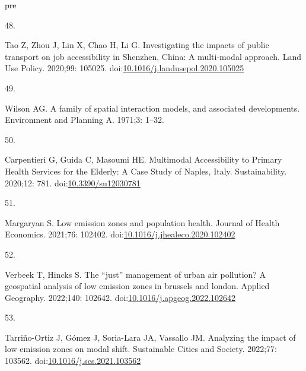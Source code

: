 \documentclass[10pt,letterpaper]{article}
\newlength{\cslhangindent}
\newlength{\csllabelwidth}
\newlength{\cslentryspacingunit} %
\newenvironment{CSLReferences}[2] %
 {%
  \setlength{\parindent}{0pt}
  \ifodd #1
  \let\oldpar\par
  \def\par{\hangindent=\cslhangindent\oldpar}
  \fi
  \setlength{\parskip}{#2\cslentryspacingunit}
 }%
 {}
\newcommand{\CSLLeftMargin}[1]{\parbox[t]{\csllabelwidth}{#1}}
\newcommand{\CSLRightInline}[1]{\parbox[t]{\linewidth - \csllabelwidth}{#1}\break}
\providecommand{\DIFdeltex}[1]{{\protect\color{red}\sout{#1}}}                      %
\providecommand{\DIFaddbegin}{} %
\providecommand{\DIFaddend}{} %
\providecommand{\DIFdelbegin}{} %
\providecommand{\DIFdelend}{} %
\providecommand{\DIFdel}[1]{\texorpdfstring{\DIFdeltex{#1}}{}} %
\newcommand{\DIFscaledelfig}{0.5}
\newlength{\DIFdelgraphicswidth} %
\newlength{\DIFdelgraphicsheight} %
\newcommand{\DIFaddincludegraphics}[2][]{{\color{blue}\fbox{\DIFOincludegraphics[#1]{#2}}}} %
\newcommand{\DIFdelincludegraphics}[2][]{%
\sbox{\DIFdelgraphicsbox}{\DIFOincludegraphics[#1]{#2}}%
\settoboxwidth{\DIFdelgraphicswidth}{\DIFdelgraphicsbox} %
\settoboxtotalheight{\DIFdelgraphicsheight}{\DIFdelgraphicsbox} %
\scalebox{\DIFscaledelfig}{%
\parbox[b]{\DIFdelgraphicswidth}{\usebox{\DIFdelgraphicsbox}\\[-\baselineskip] \rule{\DIFdelgraphicswidth}{0em}}\llap{\resizebox{\DIFdelgraphicswidth}{\DIFdelgraphicsheight}{%
\setlength{\unitlength}{\DIFdelgraphicswidth}%
\begin{picture}(1,1)%
\thicklines\linethickness{2pt} %
{\color[rgb]{1,0,0}\put(0,0){\framebox(1,1){}}}%
{\color[rgb]{1,0,0}\put(0,0){\line( 1,1){1}}}%
{\color[rgb]{1,0,0}\put(0,1){\line(1,-1){1}}}%
\end{picture}%
}\hspace*{3pt}}} %
} %
\DeclareRobustCommand{\DIFaddbegin}{\DIFOaddbegin \let\includegraphics\DIFaddincludegraphics} %
\DeclareRobustCommand{\DIFaddend}{\DIFOaddend \let\includegraphics\DIFOincludegraphics} %
\DeclareRobustCommand{\DIFdelbegin}{\DIFOdelbegin \let\includegraphics\DIFdelincludegraphics} %
\DeclareRobustCommand{\DIFdelend}{\DIFOaddend \let\includegraphics\DIFOincludegraphics} %
\begin{document}
\begin{CSLReferences}{0}{0}
{%
\DIFdel{pre}%
\DIFdelend \hypertarget{ref-taoInvestigatingImpactsPublic2020a}{}}%
\DIFdelbegin %
\DIFdelend \DIFaddbegin \CSLLeftMargin{48. }\DIFaddend %
\CSLRightInline{Tao Z, Zhou J, Lin X, Chao H, Li G. Investigating the
impacts of public transport on job accessibility in {Shenzhen}, {China}:
A multi-modal approach. Land Use Policy. 2020;99: 105025.
doi:\href{https://doi.org/10.1016/j.landusepol.2020.105025}{10.1016/j.landusepol.2020.105025}}

\leavevmode{}%
\DIFdelbegin %
\DIFdelend \DIFaddbegin \CSLLeftMargin{49. }\DIFaddend %
\CSLRightInline{Wilson AG. A family of spatial interaction models, and
associated developments. Environment and Planning A. 1971;3: 1--32. }

\leavevmode{}%
\DIFdelbegin %
\DIFdelend \DIFaddbegin \CSLLeftMargin{50. }\DIFaddend %
\CSLRightInline{Carpentieri G, Guida C, Masoumi HE. Multimodal
{Accessibility} to {Primary Health Services} for the {Elderly}: {A Case
Study} of {Naples}, {Italy}. Sustainability. 2020;12: 781.
doi:\href{https://doi.org/10.3390/su12030781}{10.3390/su12030781}}

\leavevmode{}%
\DIFdelbegin %
\DIFdelend \DIFaddbegin \CSLLeftMargin{51. }\DIFaddend %
\CSLRightInline{Margaryan S. Low emission zones and population health.
Journal of Health Economics. 2021;76: 102402.
doi:\href{https://doi.org/10.1016/j.jhealeco.2020.102402}{10.1016/j.jhealeco.2020.102402}}

\leavevmode{}%
\DIFdelbegin %
\DIFdelend \DIFaddbegin \CSLLeftMargin{52. }\DIFaddend %
\CSLRightInline{Verbeek T, Hincks S. The {``just''} management of urban
air pollution? A geospatial analysis of low emission zones in brussels
and london. Applied Geography. 2022;140: 102642.
doi:\href{https://doi.org/10.1016/j.apgeog.2022.102642}{10.1016/j.apgeog.2022.102642}}

\leavevmode{}%
\DIFdelbegin %
\DIFdelend \DIFaddbegin \CSLLeftMargin{53. }\DIFaddend %
\CSLRightInline{Tarriño-Ortiz J, Gómez J, Soria-Lara JA, Vassallo JM.
Analyzing the impact of low emission zones on modal shift. Sustainable
Cities and Society. 2022;77: 103562.
doi:\href{https://doi.org/10.1016/j.scs.2021.103562}{10.1016/j.scs.2021.103562}}


\end{CSLReferences}
\end{document}
